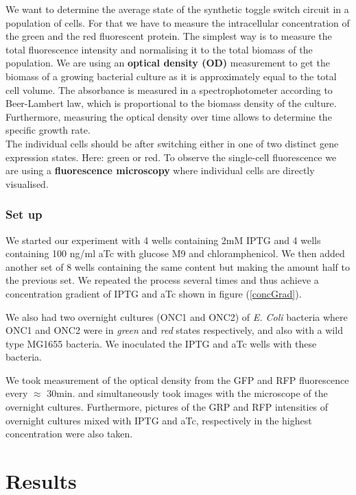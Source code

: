 \documentclass[english,11pt,a4paper]{article}
\begin{document}
We want to determine the average state of the synthetic toggle switch circuit in a population of cells. For that we have to measure the intracellular concentration of the green and the red fluorescent protein. 
The simplest way is to measure the total fluorescence intensity and normalising it to the total biomass of the population. 
We are using an \textbf{optical density (OD)} measurement to get the biomass of a growing bacterial culture as it is approximately equal to the total cell volume.
The absorbance is measured in a spectrophotometer according to Beer-Lambert law, which is proportional to the biomass density of the culture. Furthermore, measuring the optical density over time allows to determine the specific growth rate.
\\
The individual cells should be after switching either in one of two distinct gene expression states. Here: green or red. 
To observe the single-cell fluorescence we are using a \textbf{fluorescence microscopy} where individual cells are directly visualised.
\bigskip



\section{Set up}
We started our experiment with 4 wells containing 2mM IPTG and 4 wells containing 100 ng/ml aTc with glucose M9 and chloramphenicol. We then added another set of 8 wells containing the same content but making the amount half to the previous set. We repeated the process several times and thus achieve a concentration gradient of IPTG and aTc shown in figure (\ref{concGrad}). 

We also had two overnight cultures (ONC1 and ONC2) of \textit{E. Coli} bacteria where ONC1 and ONC2 were in \textit{green} and \textit{red} states respectively, and also with a wild type MG1655 bacteria. We inoculated the IPTG and aTc wells with these bacteria. 

We took measurement of the optical density from the GFP and RFP fluorescence every $\approx$ 30min. and simultaneously took images with the microscope of the overnight cultures. Furthermore, pictures of the GRP and RFP intensities of overnight cultures mixed with IPTG and aTc, respectively in the highest concentration were also taken.


 
\newpage
\part{Results}
\end{document}
